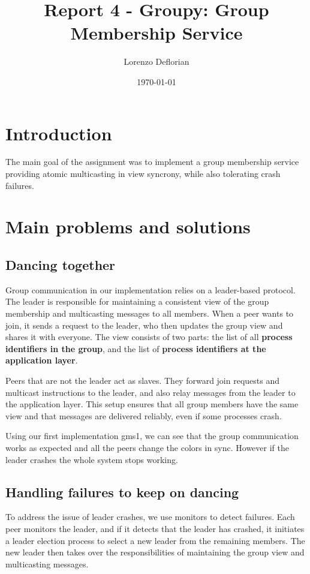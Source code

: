 \documentclass[a4paper, 11pt]{article}
\title{Report 4 - Groupy: Group Membership Service}
\author{Lorenzo Deflorian}
\date{\today{}}
\begin{document}
\maketitle

\section{Introduction}
The main goal of the assignment was to implement a group membership service providing atomic multicasting in view syncrony, while also tolerating crash failures.

\section{Main problems and solutions}
\subsection{Dancing together}
Group communication in our implementation relies on a leader-based protocol. The leader is responsible for maintaining a consistent view of the group membership and multicasting messages to all members. When a peer wants to join, it sends a request to the leader, who then updates the group view and shares it with everyone. The view consists of two parts: the list of all \textbf{process identifiers in the group}, and the list of \textbf{process identifiers at the application layer}.

Peers that are not the leader act as slaves. They forward join requests and multicast instructions to the leader, and also relay messages from the leader to the application layer. This setup ensures that all group members have the same view and that messages are delivered reliably, even if some processes crash.

Using our first implementation gms1, we can see that the group communication works as expected and all the peers change the colors in sync. However if the leader crashes the whole system stops working.

\subsection{Handling failures to keep on dancing}
To address the issue of leader crashes, we use monitors to detect failures. Each peer monitors the leader, and if it detects that the leader has crashed, it initiates a leader election process to select a new leader from the remaining members. The new leader then takes over the responsibilities of maintaining the group view and multicasting messages.
\end{document}
